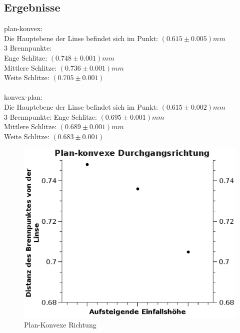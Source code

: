 \documentclass{article}
\begin{document}
\subsection{Ergebnisse}
plan-konvex:\\
Die Hauptebene der Linse befindet sich im Punkt: $(0.615 \pm 0.005)mm$\\
3 Brennpunkte:\\
Enge Schlitze: $(0.748 \pm 0.001)mm$\\
Mittlere Schlitze: $(0.736 \pm 0.001)mm$\\
Weite Schlitze: $(0.705 \pm 0.001)$\\
\\
konvex-plan:\\
Die Hauptebene der Linse befindet sich im Punkt: $(0.615 \pm 0.002)mm$\\
3 Brennpunkte:
Enge Schlitze: $(0.695 \pm 0.001)mm$\\
Mittlere Schlitze: $(0.689 \pm 0.001)mm$\\
Weite Schlitze: $(0.683 \pm 0.001)$\\
\begin{center}
\begin{figure}
\caption{Plan-Konvexe Richtung}
\includegraphics[scale=0.7]{graph1.eps}
\end{figure}
\end{center}
\end{document}
